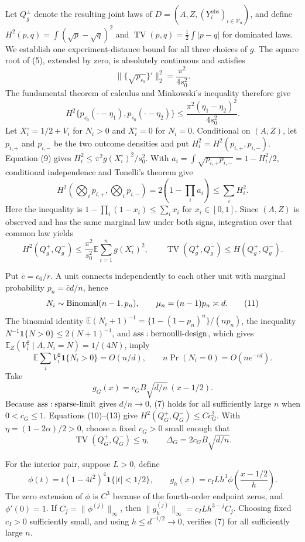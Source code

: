 Let \(Q_g^\pm\) denote the resulting joint laws of \(D=(A,Z,(Y_i^{\mathrm{obs}})_{i\in\mathcal V_n})\), and define \(H^2(p,q)=\int(\sqrt p-\sqrt q)^2\) and \(\operatorname{TV}(p,q)=\frac12\int|p-q|\) for dominated laws.  We establish one experiment-distance bound for all three choices of \(g\).  The square root of (5), extended by zero, is absolutely continuous and satisfies
\[
 \|\{\sqrt{p_{s_0}}\}'\|_2^2=\frac{\pi^2}{4s_0^2}.
\]
The fundamental theorem of calculus and Minkowski's inequality therefore give
\[
 H^2\{p_{s_0}(\mathord\cdot-\eta_1),p_{s_0}(\mathord\cdot-\eta_2)\}
 \leq\frac{\pi^2(\eta_1-\eta_2)^2}{4s_0^2}.
\tag{9}
\]
Let \(X_i^\circ=1/2+V_i\) for \(N_i>0\) and \(X_i^\circ=0\) for \(N_i=0\).  Conditional on \((A,Z)\), let \(p_{i,+}\) and \(p_{i,-}\) be the two outcome densities and put \(H_i^2=H^2(p_{i,+},p_{i,-})\).  Equation (9) gives \(H_i^2\leq\pi^2g(X_i^\circ)^2/s_0^2\).  With \(a_i=\int\sqrt{p_{i,+}p_{i,-}}=1-H_i^2/2\), conditional independence and Tonelli's theorem give
\[
 H^2\!\left(\bigotimes_i p_{i,+},\bigotimes_i p_{i,-}\right)
 =2\left(1-\prod_i a_i\right)
 \leq\sum_iH_i^2.
\]
Here the inequality is \(1-\prod_i(1-x_i)\leq\sum_i x_i\) for \(x_i\in[0,1]\).  Since \((A,Z)\) is observed and has the same marginal law under both signs, integration over that common law yields
\[
 H^2(Q_g^+,Q_g^-)
 \leq\frac{\pi^2}{s_0^2}\mathbb E\sum_{i=1}^ng(X_i^\circ)^2,
 \qquad \operatorname{TV}(Q_g^+,Q_g^-)\leq H(Q_g^+,Q_g^-).
\tag{10}
\]

Put \(\bar c=c_0/r\).  A unit connects independently to each other unit with marginal probability \(p_n=\bar c d/n\), hence
\[
 N_i\sim{\rm Binomial}(n-1,p_n),
 \qquad \mu_n=(n-1)p_n\asymp d.
\tag{11}
\]
The binomial identity \(\mathbb E(N_i+1)^{-1}=\{1-(1-p_n)^n\}/(np_n)\), the inequality \(N^{-1}\mathbf1\{N>0\}\leq2(N+1)^{-1}\), and \({\rm ass:bernoulli\text{-}design}\), which gives \(\mathbb E_Z(V_i^2\mid A,N_i=N)=1/(4N)\), imply
\[
 \mathbb E\sum_iV_i^2\mathbf1\{N_i>0\}=O(n/d),
 \qquad n\Pr(N_i=0)=O(ne^{-cd}).
\tag{12}
\]
Take
\[
 g_G(x)=c_GB\sqrt{d/n}\,(x-1/2).
\tag{13}
\]
Because \({\rm ass:sparse\text{-}limit}\) gives \(d/n\to0\), (7) holds for all sufficiently large \(n\) when \(0<c_G\leq1\).  Equations (10)--(13) give \(H^2(Q_G^+,Q_G^-)\leq Cc_G^2\).  With \(\eta=(1-2\alpha)/2>0\), choose a fixed \(c_G>0\) small enough that
\[
 \operatorname{TV}(Q_G^+,Q_G^-)\leq\eta,
 \qquad \Delta_G=2c_GB\sqrt{d/n}.
\tag{14}
\]

For the interior pair, suppose \(L>0\), define
\[
 \phi(t)=t(1-4t^2)^4\mathbf1\{|t|<1/2\},
 \qquad g_h(x)=c_ILh^3\phi\!\left(\frac{x-1/2}{h}\right).
\tag{15}
\]
The zero extension of \(\phi\) is \(C^3\) because of the fourth-order endpoint zeros, and \(\phi'(0)=1\).  If \(C_j=\|\phi^{(j)}\|_\infty\), then \(\|g_h^{(j)}\|_\infty=c_ILh^{3-j}C_j\).  Choosing fixed \(c_I>0\) sufficiently small, and using \(h\leq d^{-1/2}\to0\), verifies (7) for all sufficiently large \(n\).

